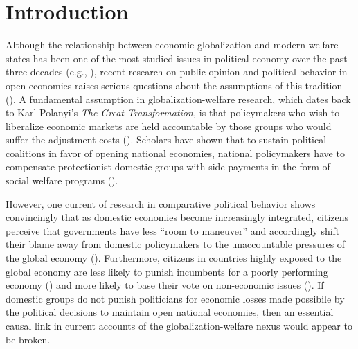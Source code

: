 \documentclass[12pt]{report}
\begin{document}
\section{Introduction}

Although the relationship between economic globalization and modern welfare states has been one of
the most studied issues in political economy over the past three decades (e.g., \citealt[316]{Gourevitch:1978bn,Garrett:1995tj,Rodrik:1998te,Burgoon:2001dp,Adsera:2002vt,Oatley:2011hv}), recent
research on public opinion and political behavior in open economies raises serious questions about
the assumptions of this tradition (\citealt[155]{Hellwig:2007wt}). A fundamental assumption in
globalization-welfare research, which dates back to Karl Polanyi's \emph{The Great Transformation,}
is that policymakers who wish to liberalize economic markets are held accountable by those groups
who would suffer the adjustment costs (\citealt{Polanyi:2001vc,Ruggie:1982wx}). Scholars have shown
that to sustain political coalitions in favor of opening national economies, national policymakers
have to compensate protectionist domestic groups with side payments in the form of social welfare
programs (\citealt[1028-29]{Katzenstein:1985ub,Rodrik:1998te,Adsera:2002vt}).

However, one current of research in comparative political behavior shows convincingly that as
domestic economies become increasingly integrated, citizens perceive that governments have less
``room to maneuver'' and accordingly shift their blame away from domestic policymakers to the
unaccountable pressures of the global economy (\citealt{Alcaniz:2010gb,Hellwig:2012vk}).
Furthermore, citizens in countries highly exposed to the global economy are less likely to punish
incumbents for a poorly performing economy (\citealt{Hellwig:2007gn}) and more likely to base their
vote on non-economic issues (\citealt{Hellwig:2008ia}). If domestic groups do not punish politicians
for economic losses made possibile by the political decisions to maintain open national economies,
then an essential causal link in current accounts of the globalization-welfare nexus would appear to
be broken.
\end{document}
